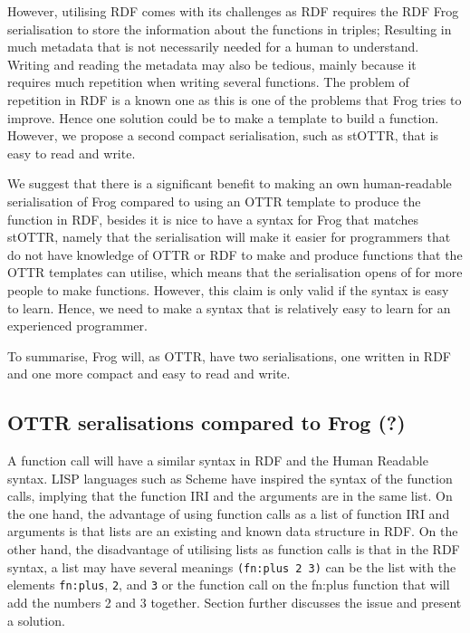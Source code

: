 \para
However, utilising RDF comes with its challenges as RDF requires the RDF Frog serialisation to store the information about the functions in triples; Resulting in much metadata that is not necessarily needed for a human to understand. Writing and reading the metadata may also be tedious, mainly because it requires much repetition when writing several functions. The problem of repetition in RDF is a known one as this is one of the problems that Frog tries to improve. Hence one solution could be to make a template to build a function. However, we propose a second compact serialisation, such as stOTTR, that is easy to read and write. 

\para
We suggest that there is a significant benefit to making an own human-readable serialisation of Frog compared to using an OTTR template to produce the function in RDF, besides it is nice to have a syntax for Frog that matches stOTTR, namely that the serialisation will make it easier for programmers that do not have knowledge of OTTR or RDF to make and produce functions that the OTTR templates can utilise, which means that the serialisation opens of for more people to make functions. However, this claim is only valid if the syntax is easy to learn. Hence, we need to make a syntax that is relatively easy to learn for an experienced programmer. 

\para 
To summarise, Frog will, as OTTR, have two serialisations, one written in RDF and one more compact and easy to read and write. 

\subsection{OTTR seralisations compared to Frog (?)}

\para 
A function call will have a similar syntax in RDF and the Human Readable syntax. LISP languages such as Scheme have inspired the syntax of the function calls, implying that the function IRI and the arguments are in the same list. On the one hand, the advantage of using function calls as a list of function IRI and arguments is that lists are an existing and known data structure in RDF. On the other hand, the disadvantage of utilising lists as function calls is that in the RDF syntax, a list may have several meanings \lstinline{(fn:plus 2 3)} can be the list with the elements \lstinline{fn:plus}, \lstinline{2}, and \lstinline{3} or the function call on the fn:plus function that will add the numbers 2 and 3 together. Section \cite{RDF_syntax} further discusses the issue and present a solution.

